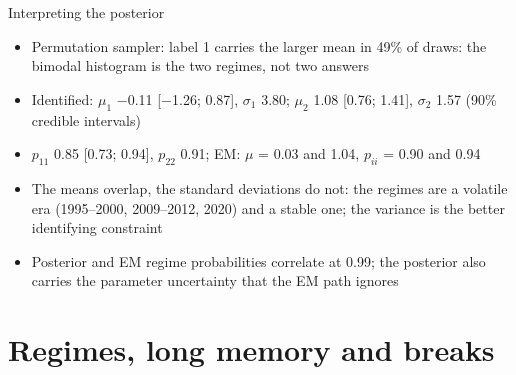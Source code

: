 \begin{frame}{Interpreting the posterior}
\itemsize{\footnotesize}
\begin{itemize}
    \item Permutation sampler: label 1 carries the larger mean in 49\% of draws: the bimodal histogram is the two regimes, not two answers
    \item Identified: $\mu_1$ \ensuremath{-}0.11 [\ensuremath{-}1.26; 0.87], $\sigma_1$ 3.80; $\mu_2$ 1.08 [0.76; 1.41], $\sigma_2$ 1.57 (90\% credible intervals)
    \item $p_{11}$ 0.85 [0.73; 0.94], $p_{22}$ 0.91; EM: $\mu$ = 0.03 and 1.04, $p_{ii}$ = 0.90 and 0.94
    \item The means overlap, the standard deviations do not: the regimes are a volatile era (1995--2000, 2009--2012, 2020) and a stable one; the variance is the better identifying constraint
    \item Posterior and EM regime probabilities correlate at 0.99; the posterior also carries the parameter uncertainty that the EM path ignores
\end{itemize}
\end{frame}


\section{Regimes, long memory and breaks}

